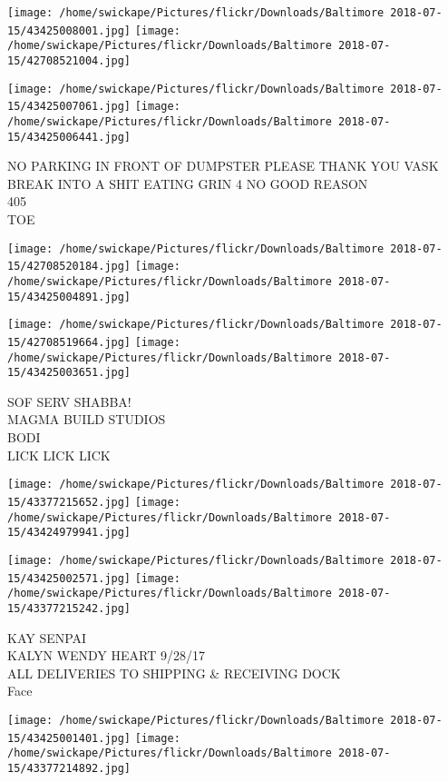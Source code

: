 \documentclass[10pt,letterpaper]{article}
\begin{document}
\texttt{[image: /home/swickape/Pictures/flickr/Downloads/Baltimore 2018-07-15/43425008001.jpg]}
\texttt{[image: /home/swickape/Pictures/flickr/Downloads/Baltimore 2018-07-15/42708521004.jpg]}

\texttt{[image: /home/swickape/Pictures/flickr/Downloads/Baltimore 2018-07-15/43425007061.jpg]}
\texttt{[image: /home/swickape/Pictures/flickr/Downloads/Baltimore 2018-07-15/43425006441.jpg]}

NO PARKING IN FRONT OF DUMPSTER PLEASE THANK YOU VASK\\
BREAK INTO A SHIT EATING GRIN 4 NO GOOD REASON\\
405\\
TOE\\
\pagebreak

\texttt{[image: /home/swickape/Pictures/flickr/Downloads/Baltimore 2018-07-15/42708520184.jpg]}
\texttt{[image: /home/swickape/Pictures/flickr/Downloads/Baltimore 2018-07-15/43425004891.jpg]}

\texttt{[image: /home/swickape/Pictures/flickr/Downloads/Baltimore 2018-07-15/42708519664.jpg]}
\texttt{[image: /home/swickape/Pictures/flickr/Downloads/Baltimore 2018-07-15/43425003651.jpg]}

SOF SERV SHABBA!\\
MAGMA BUILD STUDIOS\\
BODI\\
LICK LICK LICK\\
\pagebreak

\texttt{[image: /home/swickape/Pictures/flickr/Downloads/Baltimore 2018-07-15/43377215652.jpg]}
\texttt{[image: /home/swickape/Pictures/flickr/Downloads/Baltimore 2018-07-15/43424979941.jpg]}

\texttt{[image: /home/swickape/Pictures/flickr/Downloads/Baltimore 2018-07-15/43425002571.jpg]}
\texttt{[image: /home/swickape/Pictures/flickr/Downloads/Baltimore 2018-07-15/43377215242.jpg]}

KAY SENPAI\\
KALYN WENDY HEART 9/28/17\\
ALL DELIVERIES TO SHIPPING \& RECEIVING DOCK\\
Face\\
\pagebreak

\texttt{[image: /home/swickape/Pictures/flickr/Downloads/Baltimore 2018-07-15/43425001401.jpg]}
\texttt{[image: /home/swickape/Pictures/flickr/Downloads/Baltimore 2018-07-15/43377214892.jpg]}
\end{document}
